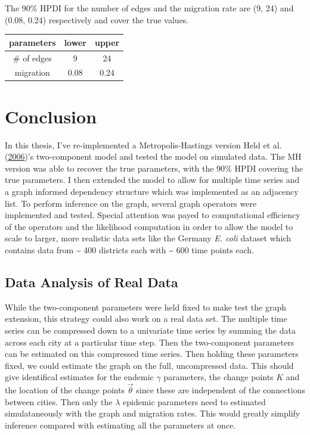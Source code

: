 \documentclass[11pt,a4paper]{article}
\begin{document}
The 90\% HPDI for the number of edges and the migration rate are (9, 24)
and (0.08, 0.24) respectively and cover the true values.

\begin{longtable}[]{@{}ccc@{}}
\toprule
parameters & lower & upper\tabularnewline
\midrule
\endhead
\# of edges & 9 & 24\tabularnewline
migration & 0.08 & 0.24\tabularnewline
\bottomrule
\end{longtable}

\pagebreak

\hypertarget{conclusion}{%
\section{Conclusion}\label{conclusion}}

In this thesis, I've re-implemented a Metropolis-Hastings version Held
et al. (\protect\hyperlink{ref-held_two-component_2006}{2006})'s
two-component model and tested the model on simulated data. The MH
version was able to recover the true parameters, with the 90\% HPDI
covering the true parameters. I then extended the model to allow for
multiple time series and a graph informed dependency structure which was
implemented as an adjacency list. To perform inference on the graph,
several graph operators were implemented and tested. Special attention
was payed to computational efficiency of the operators and the
likelihood computation in order to allow the model to scale to larger,
more realistic data sets like the Germany \emph{E. coli} dataset which
contains data from \textasciitilde{} 400 districts each with
\textasciitilde{} 600 time points each.

\hypertarget{data-analysis-of-real-data}{%
\subsection{Data Analysis of Real
Data}\label{data-analysis-of-real-data}}

While the two-component parameters were held fixed to make test the
graph extension, this strategy could also work on a real data set. The
multiple time series can be compressed down to a univariate time series
by summing the data across each city at a particular time step. Then the
two-component parameters can be estimated on this compressed time
series. Then holding these parameters fixed, we could estimate the graph
on the full, uncompressed data. This should give identifical estimates
for the endemic \(\gamma\) parameters, the change points \(K\) and the
location of the change points \(\vec{\theta}\) since these are
independent of the connections between cities. Then only the \(\lambda\)
epidemic parameters need to estimated simulataneously with the graph and
migration rates. This would greatly simplify inference compared with
estimating all the parameters at once.
\end{document}
